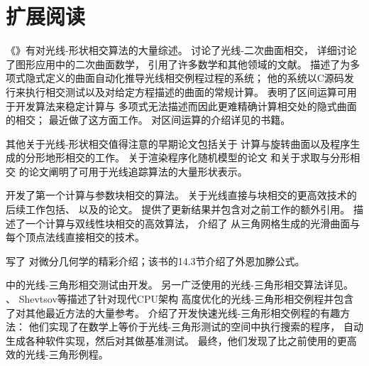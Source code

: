 \section{扩展阅读}\label{sec:扩展阅读03}
《》有对光线-形状相交算法的大量综述\citep{10.5555/94788}。
\citet{doi:10.1177/003754977101600104}讨论了光线-二次曲面相交，
\citet{Heckbert84themathematics}详细讨论了图形应用中的二次曲面数学，
引用了许多数学和其他领域的文献。
\citet{10.1145/964967.801136}描述了为多项式隐式定义的曲面自动化推导光线相交例程过程的系统；
他的系统以C源码发行来执行相交测试以及对给定方程描述的曲面的常规计算。
\citet{10.5555/93267.93276}表明了区间运算可用于开发算法来稳定计算与
多项式无法描述而因此更难精确计算相交处的隐式曲面的相交；
\citet{10.1111/j.1467-8659.2008.01189.x}最近做了这方面工作。
对区间运算的介绍详见\citet{moore1966interval}的书籍。

其他关于光线-形状相交值得注意的早期论文包括\citet{10.1145/800059.801137}关于
计算与旋转曲面以及程序生成的分形地形相交的工作。
\citet{10.1145/358523.358553}关于渲染程序化随机模型的论文
和\citet{10.1145/74333.74363}关于求取与分形相交
的论文阐明了可用于光线追踪算法的大量形状表示。

\citet{10.1145/800064.801287}开发了第一个计算与参数块相交的算法。
关于光线直接与块相交的更高效技术的后续工作包括\citet{722295}、
\citet{doi:10.1080/10867651.2000.10487519}
以及\citet{https://doi.org/10.1111/1467-8659.00535}的论文。
\citet{doi:10.1080/2151237X.2006.10129218}
提供了更新结果并包含对之前工作的额外引用。
\citet{doi:10.1080/10867651.2004.10504896}描述了一个计算与双线性块相交的高效算法，
\citet{10.1111/j.1467-8659.2011.01993.x}介绍了
从三角网格生成的光滑曲面与每个顶点法线直接相交的技术。

\citet{gray2017modern}写了
对微分几何学的精彩介绍；该书的14.3节介绍了外恩加滕公式。

中的光线-三角形相交测试由\citet{Woop2013Watertight}开发。
另一广泛使用的光线-三角形相交算法详见\citet{doi:10.1080/10867651.1997.10487468}。
\citet{doi:10.1080/2151237X.2005.10129208}、
Shevtsov等\parencite*{shevtsov2007ray}描述了针对现代CPU架构
高度优化的光线-三角形相交例程并包含了对其他最近方法的大量参考。
\citet{4061543}介绍了开发快速光线-三角形相交例程的有趣方法：
他们实现了在数学上等价于光线-三角形测试的空间中执行搜索的程序，
自动生成各种软件实现，然后对其做基准测试。
最终，他们发现了比之前使用的更高效的光线-三角形例程。

